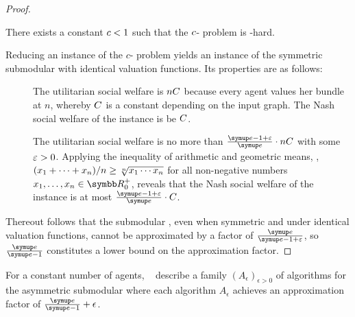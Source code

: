 \begin{proof}
	\begin{proposition}
		There exists a constant \(c < 1\) such that the \(c\)-\Gap{} problem is \NP\kern1.5pt-hard.
	\end{proposition}

	\medskip
	Reducing an instance of the \(c\)-\Gap{} problem yields an instance of the symmetric submodular \USW{} with identical valuation functions.
	Its properties are as follows:
	\begin{description}
		\item[\Yes]
		The utilitarian social welfare is \(n C\) because every agent values her bundle at \(n\), whereby \(C\) is a constant depending on the input graph.
		The Nash social welfare of the instance is be \(C\).

		\item[\No]
		The utilitarian social welfare is no more than \(\afinv \cdot n \USWconstant\) with some \(\varepsilon > 0\).
		Applying the inequality of arithmetic and geometric means, \ie{}, \((x_1 + \dots + x_n)/n \ge \smash{\sqrt[n]{x_1 \dotsm x_n}}\) for all non-negative numbers \(x_1, \dots, x_n \in \realposzero\), reveals that the Nash social welfare of the instance is at most \(\afinv \cdot \USWconstant\).
	\end{description}
	Thereout follows that the submodular \NSW{}, even when symmetric and under identical valuation functions, cannot be approximated by a factor of \(\afconst\), so \(\af\) constitutes a lower bound on the approximation factor.
\end{proof}

For a constant number of agents, \citeauthor{APNSWuSVþUM}~\cite[Section 5.1]{APNSWuSVþUM} describe a family \((A_{\epsilon})_{\epsilon > 0}\) of algorithms for the asymmetric submodular \NSW{} where each algorithm \(A_\epsilon\) achieves an approximation factor of \(\af + \epsilon\).

